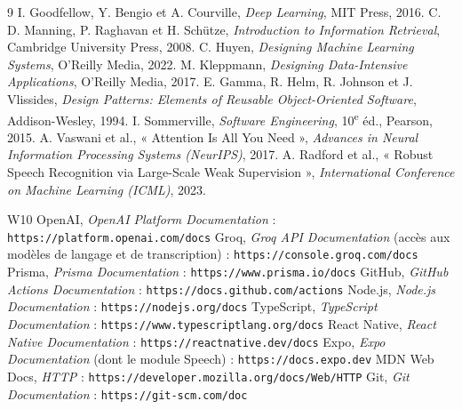 \documentclass[11pt,a4paper,openany,oneside]{report}
\begin{document}
\clearpage
{}
{}
\renewcommand{\bibname}{Bibliographie}
\begin{thebibliography}{9}
 I. Goodfellow, Y. Bengio et A. Courville, \emph{Deep Learning}, MIT Press, 2016.
 C. D. Manning, P. Raghavan et H. Schütze, \emph{Introduction to Information Retrieval}, Cambridge University Press, 2008.
 C. Huyen, \emph{Designing Machine Learning Systems}, O'Reilly Media, 2022.
 M. Kleppmann, \emph{Designing Data-Intensive Applications}, O'Reilly Media, 2017.
 E. Gamma, R. Helm, R. Johnson et J. Vlissides, \emph{Design Patterns: Elements of Reusable Object-Oriented Software}, Addison-Wesley, 1994.
 I. Sommerville, \emph{Software Engineering}, 10\textsuperscript{e} éd., Pearson, 2015.
 A. Vaswani et al., « Attention Is All You Need », \emph{Advances in Neural Information Processing Systems (NeurIPS)}, 2017.
 A. Radford et al., « Robust Speech Recognition via Large-Scale Weak Supervision », \emph{International Conference on Machine Learning (ICML)}, 2023.
\end{thebibliography}

\clearpage
{}
{}
\renewcommand{\bibname}{Webographie}
\begin{thebibliography}{W10}
 OpenAI, \emph{OpenAI Platform Documentation} : \texttt{https://platform.openai.com/docs}
 Groq, \emph{Groq API Documentation} (accès aux modèles de langage et de transcription) : \texttt{https://console.groq.com/docs}
 Prisma, \emph{Prisma Documentation} : \texttt{https://www.prisma.io/docs}
 GitHub, \emph{GitHub Actions Documentation} : \texttt{https://docs.github.com/actions}
 Node.js, \emph{Node.js Documentation} : \texttt{https://nodejs.org/docs}
 TypeScript, \emph{TypeScript Documentation} : \texttt{https://www.typescriptlang.org/docs}
 React Native, \emph{React Native Documentation} : \texttt{https://reactnative.dev/docs}
 Expo, \emph{Expo Documentation} (dont le module Speech) : \texttt{https://docs.expo.dev}
 MDN Web Docs, \emph{HTTP} : \texttt{https://developer.mozilla.org/docs/Web/HTTP}
 Git, \emph{Git Documentation} : \texttt{https://git-scm.com/doc}
\end{thebibliography}
\end{document}
